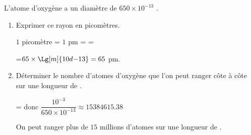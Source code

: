     L’atome d’oxygène a un diamètre de $650 \times 10^{-13}$ \Lg[m]{}.

    \begin{enumerate}
        \item Exprimer ce rayon en picomètres.

        {\red $1$ picomètre = $1$ pm =  = 

        =$65\times\Lg[m]{10d{-13}}=65$ pm.
        }
        \item Déterminer le nombre d'atomes d’oxygène que l'on peut ranger côte à côte sur une longueur de .

        {\red {} =  donc $\dfrac{10^{-3}}{650\times 10^{-13}}\approx\num{15384615.38}$

        On peut ranger plus de $15$ millions d'atomes sur une longueur de .
        }
    \end{enumerate}

